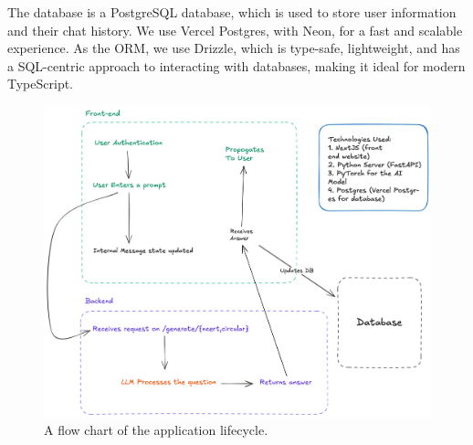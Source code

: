 \documentclass[9pt,a4paper,twocolumn,twoside]{tau-class/tau}
\begin{document}
The database is a PostgreSQL database, which is used to store user information and their chat history. We use Vercel Postgres, with Neon, for a fast and scalable experience. As the ORM, we use Drizzle, which is type-safe, lightweight, and has a SQL-centric approach to interacting with databases, making it ideal for modern TypeScript.

\begin{figure}[h]
	\centering
	\includegraphics[width=2\linewidth]{./flow-chart.png}
	\caption{A flow chart of the application lifecycle.}
	\label{fig:1}
\end{figure}
\end{document}
